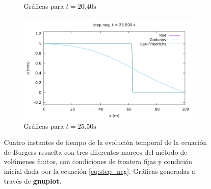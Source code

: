 \documentclass[12pt]{article}
\begin{document}
\begin{figure}[h]
\begin{subfigure}[b]{0.49\textwidth}
 		\caption*{Gráficas para $t=20.40\unit{\second}$}
 		\label{fig:step_neg-fija3}
 	\end{subfigure}
 	\vfill
 	\begin{subfigure}[b]{0.49\textwidth}
 		\includegraphics[width=\textwidth]{../burgers1DVF/results/sol_fijas/step_neg/850.pdf}
 		\caption*{Gráficas para $t=25.50\unit{\second}$}
 		\label{fig:step_neg-fija4}
 	\end{subfigure}
 	\caption{Cuatro instantes de tiempo de la evolución temporal de la ecuación de Burgers resuelta con tres diferentes marcos del método de volúmenes finitos, con condiciones de frontera fijas y condición inicial dada por la ecuación \ref{eq:step_neg}. Gráficas generadas a través de \textbf{gnuplot.}}
 	\label{fig:instantes-step_neg-fija}
 \end{figure}
 
\end{document}
